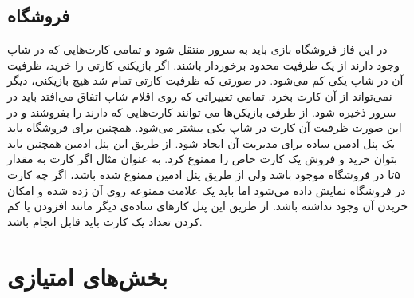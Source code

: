\documentclass[]{article}
\begin{document}
\subsection*{{\titr فروشگاه}}
در این فاز فروشگاه بازی باید به سرور منتقل شود و تمامی کارت‌هایی که در شاپ وجود دارند از یک ظرفیت محدود برخوردار باشند. اگر بازیکنی کارتی را خرید، ظرفیت آن در شاپ یکی کم می‌شود. در صورتی که ظرفیت کارتی تمام شد هیچ بازیکنی، دیگر نمی‌تواند از آن کارت بخرد. تمامی تغییراتی که روی اقلام شاپ اتفاق می‌افتد باید در سرور ذخیره شود. از طرفی بازیکن‌ها می توانند کارت‌هایی که دارند را بفروشند و در این صورت ظرفیت آن کارت در شاپ یکی بیشتر می‌شود. همچنین برای فروشگاه باید یک پنل ادمین ساده برای مدیریت آن ایجاد شود. از طریق این پنل ادمین همچنین باید بتوان خرید و فروش یک کارت خاص را ممنوع کرد. به عنوان مثال اگر کارت  به مقدار ۵تا در فروشگاه موجود باشد ولی از طریق پنل ادمین ممنوع شده باشد، اگر چه کارت در فروشگاه نمایش داده می‌شود اما باید یک علامت ممنوعه روی آن زده شده و امکان خریدن آن وجود نداشته باشد. از طریق این پنل کارهای ساده‌ی دیگر مانند افزودن یا کم کردن تعداد یک کارت باید قابل انجام باشد.




\section*{{\titr بخش‌های امتیازی}}
\end{document}
